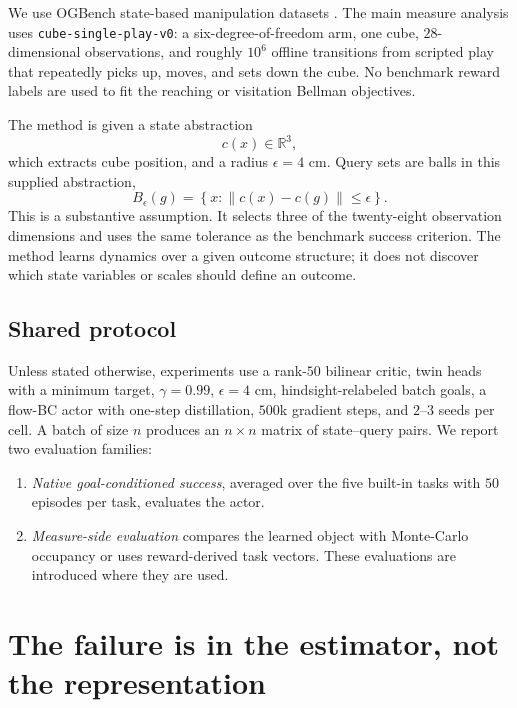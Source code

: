 \documentclass{article}
\newcommand{\cube}{c}
\begin{document}
We use OGBench state-based manipulation datasets \citep{park2024ogbench}. The main
measure analysis uses \texttt{cube-single-play-v0}: a six-degree-of-freedom arm,
one cube, $28$-dimensional observations, and roughly $10^6$ offline transitions
from scripted play that repeatedly picks up, moves, and sets down the cube. No
benchmark reward labels are used to fit the reaching or visitation Bellman
objectives.

The method is given a state abstraction
\begin{equation}
\cube(x)\in\mathbb{R}^{3},
\end{equation}
which extracts cube position, and a radius $\epsilon=4$ cm. Query sets are balls
in this supplied abstraction,
\begin{equation}
\label{eq:region}
B_\epsilon(g)
=
\left\{x:\|\cube(x)-\cube(g)\|\le\epsilon\right\}.
\end{equation}
This is a substantive assumption. It selects three of the twenty-eight
observation dimensions and uses the same tolerance as the benchmark success
criterion. The method learns dynamics over a given outcome structure; it does not
discover which state variables or scales should define an outcome.

\subsection{Shared protocol}
\label{sec:protocol}

Unless stated otherwise, experiments use a rank-$50$ bilinear critic, twin heads
with a minimum target, $\gamma=0.99$, $\epsilon=4$ cm, hindsight-relabeled batch
goals, a flow-BC actor with one-step distillation, $500$k gradient steps, and
$2$--$3$ seeds per cell. A batch of size $n$ produces an $n\times n$ matrix of
state--query pairs. We report two evaluation families:
\begin{enumerate}
    \item \emph{Native goal-conditioned success}, averaged over the five built-in
    tasks with $50$ episodes per task, evaluates the actor.
    \item \emph{Measure-side evaluation} compares the learned object with
    Monte-Carlo occupancy or uses reward-derived task vectors. These evaluations
    are introduced where they are used.
\end{enumerate}

\section{The failure is in the estimator, not the representation}
\label{sec:estimator}
\end{document}
